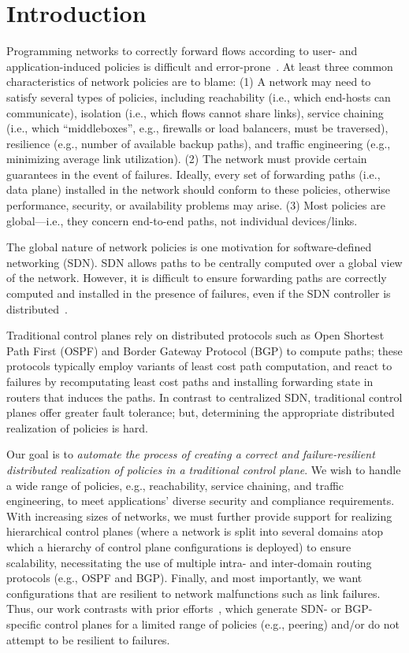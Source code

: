 \section{Introduction}
Programming networks to correctly forward flows according to user- and
application-induced policies is difficult and
error-prone~\cite{troubleshooting, bgpmisconfig}. 
At least three
common characteristics of network policies are to blame: (1) A network
may need to satisfy several types of policies, including reachability
(i.e., which end-hosts can communicate), isolation (i.e., which flows
cannot share links), service chaining (i.e., which ``middleboxes'',
e.g., firewalls or load balancers, must be traversed), resilience
(e.g., number of available backup paths), and traffic engineering
(e.g., minimizing average link utilization). (2) The network must
provide certain guarantees in the event of failures. Ideally, every
set of forwarding paths (i.e., data plane) installed in the network
should conform to these policies, otherwise performance, security, or
availability problems may arise. (3) Most policies are global---i.e.,
they concern end-to-end paths, not individual devices/links.

The global nature of network policies is one motivation for
software-defined networking (SDN). SDN allows paths to be centrally
computed over a global view of the network. However, it is difficult
to ensure forwarding paths are correctly computed and installed in the
presence of failures, even if the SDN controller is
distributed~\cite{hasdn}.

Traditional control planes rely on distributed protocols such as Open
Shortest Path First (OSPF) and Border Gateway Protocol (BGP) to
compute paths; these protocols typically employ variants of least cost
path computation, and react to failures by recomputating least cost
paths and installing forwarding state in routers that induces the
paths. In contrast to centralized SDN, traditional control planes
offer greater fault tolerance; but, determining the appropriate
distributed realization of policies is hard.

Our goal is to {\em automate the process of creating a correct and
  failure-resilient distributed realization of policies in a
  traditional control plane}. We wish to handle a wide range of
policies, e.g., reachability, service chaining, and traffic
engineering, to meet applications' diverse security and compliance
requirements.  With increasing sizes of networks, we must further
provide support for realizing hierarchical control planes (where a
network is split into several domains atop which a hierarchy of
control plane configurations is deployed) to ensure scalability,
necessitating the use of multiple intra- and inter-domain routing
protocols (e.g., OSPF and BGP).  Finally, and most importantly, we
want configurations that are resilient to network malfunctions such as
link failures.  Thus, our work contrasts with prior
efforts~\cite{netegg, propane, merlin, simple, fattire, netkat,
  netkatcompiler, sol}, which generate SDN- or BGP-specific control
planes for a limited range of policies (e.g., peering) 
and/or do not attempt to be resilient to failures.



